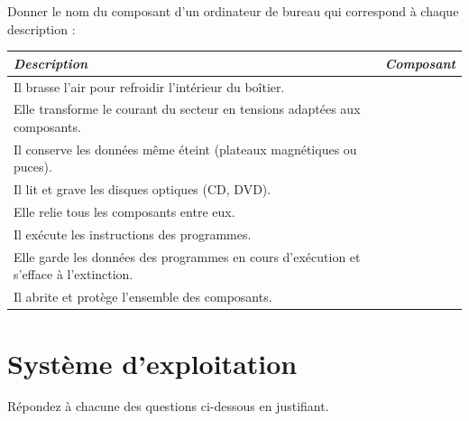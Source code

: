 \documentclass[a4paper, noanswers, addpoints, 12pt]{exam}
\begin{document}
\begin{questions}

\question[2] Donner le nom du composant d'un ordinateur de bureau qui correspond à chaque description :\\[1ex]
\begin{center}
\renewcommand{\arraystretch}{2.1}
\begin{tabular}{|p{10.5cm}|p{4.5cm}|}
\hline
\textit{Description} & \textit{Composant} \\ \hline
Il brasse l'air pour refroidir l'intérieur du boîtier. & \\ \hline
Elle transforme le courant du secteur en tensions adaptées aux composants. & \\ \hline
Il conserve les données même éteint (plateaux magnétiques ou puces). & \\ \hline
Il lit et grave les disques optiques (CD, DVD). & \\ \hline
Elle relie tous les composants entre eux. & \\ \hline
Il exécute les instructions des programmes. & \\ \hline
Elle garde les données des programmes en cours d'exécution et s'efface à l'extinction. & \\ \hline
Il abrite et protège l'ensemble des composants. & \\ \hline
\end{tabular}
\end{center}

\section{Système d'exploitation}

\question[2] Répondez à chacune des questions ci-dessous en justifiant.
\begin{parts}

\end{parts}
\end{questions}
\end{document}
